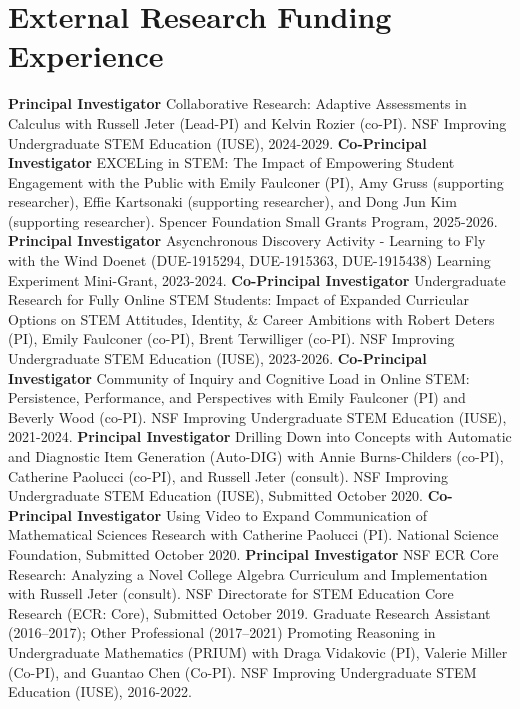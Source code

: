 \documentclass[10pt,a4paper,sans]{moderncv}
\begin{document}
\section{External Research Funding Experience}
	{\textbf{Principal Investigator}}
	{Collaborative Research: Adaptive Assessments in Calculus}
	{with Russell Jeter (Lead-PI) and Kelvin Rozier (co-PI). 
	NSF Improving Undergraduate STEM Education (IUSE), 2024-2029.}
	{}{}
	{\textbf{Co-Principal Investigator}}
	{EXCELing in STEM: The Impact of Empowering Student Engagement with the Public}
	{with Emily Faulconer (PI), Amy Gruss (supporting researcher), Effie Kartsonaki (supporting researcher), and Dong Jun Kim (supporting researcher). 
	Spencer Foundation Small Grants Program, 2025-2026.}
	{}{}
	{\textbf{Principal Investigator}}
	{Asycnchronous Discovery Activity - Learning to Fly with the Wind}
	{Doenet (DUE-1915294, DUE-1915363, DUE-1915438) Learning Experiment Mini-Grant, 2023-2024.}
	{}{}
	{\textbf{Co-Principal Investigator}}
	{Undergraduate Research for Fully Online STEM Students: Impact of Expanded Curricular Options on STEM Attitudes, Identity, \& Career Ambitions}
	{with Robert Deters (PI), Emily Faulconer (co-PI), Brent Terwilliger (co-PI). NSF Improving Undergraduate STEM Education (IUSE), 2023-2026.}
	{}{}
	{\textbf{Co-Principal Investigator}}
	{Community of Inquiry and Cognitive Load in Online STEM: Persistence, Performance, and Perspectives}
	{with Emily Faulconer (PI) and Beverly Wood (co-PI). NSF Improving Undergraduate STEM Education (IUSE), 2021-2024.}
	{}{}
	{\textbf{Principal Investigator}}
	{Drilling Down into Concepts with Automatic and Diagnostic Item Generation (Auto-DIG)}
	{with Annie Burns-Childers (co-PI), Catherine Paolucci (co-PI), and Russell Jeter (consult). NSF Improving Undergraduate STEM Education (IUSE), Submitted October 2020.}
	{}{}
	{\textbf{Co-Principal Investigator}}
	{Using Video to Expand Communication of Mathematical Sciences Research}
	{with Catherine Paolucci (PI). National Science Foundation, Submitted October 2020.}
	{}{}
	{\textbf{Principal Investigator}}
	{NSF ECR Core Research: Analyzing a Novel College Algebra Curriculum and Implementation}
	{with Russell Jeter (consult). NSF Directorate for STEM Education Core Research (ECR: Core), Submitted October 2019.}
	{}{}
	{Graduate Research Assistant (2016--2017); Other Professional (2017--2021)}
	{Promoting Reasoning in Undergraduate Mathematics (PRIUM)}
	{with Draga Vidakovic (PI), Valerie Miller (Co-PI), and Guantao Chen (Co-PI). NSF Improving Undergraduate STEM Education (IUSE), 2016-2022.}
	{}{}
\end{document}
